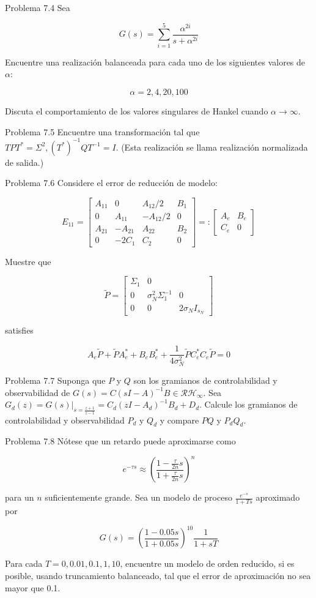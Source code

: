 Problema 7.4 Sea

$$
G(s)=\sum_{i=1}^{5} \frac{\alpha^{2 i}}{s+\alpha^{2 i}}
$$

Encuentre una realización balanceada para cada uno de los siguientes valores de $\alpha$:

$$
\alpha=2,4,20,100
$$

Discuta el comportamiento de los valores singulares de Hankel cuando $\alpha \rightarrow \infty$.

Problema 7.5 Encuentre una transformación tal que $T P T^{*}=\Sigma^{2},\left(T^{*}\right)^{-1} Q T^{-1}=I$. (Esta realización se llama realización normalizada de salida.)

Problema 7.6 Considere el error de reducción de modelo:

$$
E_{11}=\left[\begin{array}{ccc|c}
A_{11} & 0 & A_{12} / 2 & B_{1} \\
0 & A_{11} & -A_{12} / 2 & 0 \\
A_{21} & -A_{21} & A_{22} & B_{2} \\
\hline 0 & -2 C_{1} & C_{2} & 0
\end{array}\right]=:\left[\begin{array}{c|c}
A_{e} & B_{e} \\
\hline C_{e} & 0
\end{array}\right]
$$

Muestre que

$$
\tilde{P}=\left[\begin{array}{ccc}
\Sigma_{1} & 0 & \\
0 & \sigma_{N}^{2} \Sigma_{1}^{-1} & 0 \\
0 & 0 & 2 \sigma_{N} I_{s_{N}}
\end{array}\right]
$$

satisfies

$$
A_{e} \tilde{P}+\tilde{P} A_{e}^{*}+B_{e} B_{e}^{*}+\frac{1}{4 \sigma_{N}^{2}} \tilde{P} C_{e}^{*} C_{e} \tilde{P}=0
$$

Problema 7.7 Suponga que $P$ y $Q$ son los gramianos de controlabilidad y observabilidad de $G(s)=C(s I-A)^{-1} B \in \mathcal{R} \mathcal{H}_{\infty}$. Sea $G_{d}(z)=\left.G(s)\right|_{s=\frac{z+1}{z-1}}=C_{d}\left(z I-A_{d}\right)^{-1} B_{d}+D_{d}$. Calcule los gramianos de controlabilidad y observabilidad $P_{d}$ y $Q_{d}$ y compare $P Q$ y $P_{d} Q_{d}$.

Problema 7.8 Nótese que un retardo puede aproximarse como

$$
e^{-\tau s} \approx\left(\frac{1-\frac{\tau}{2 n} s}{1+\frac{\tau}{2 n} s}\right)^{n}
$$

para un $n$ suficientemente grande. Sea un modelo de proceso $\frac{e^{-s}}{1+T s}$ aproximado por

$$
G(s)=\left(\frac{1-0.05 s}{1+0.05 s}\right)^{10} \frac{1}{1+s T}
$$

Para cada $T=0,0.01,0.1,1,10$, encuentre un modelo de orden reducido, si es posible, usando truncamiento balanceado, tal que el error de aproximación no sea mayor que 0.1.

